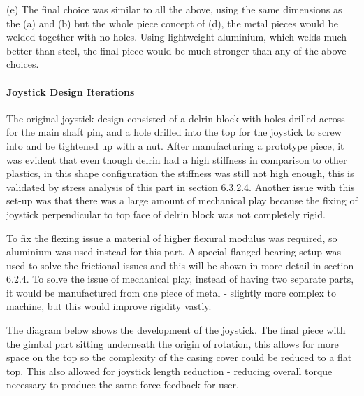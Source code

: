 (e) The final choice was similar to all the above, using the same dimensions as the (a) and (b) but the whole piece concept of (d), the metal pieces would be welded together with no holes. Using lightweight aluminium, which welds much better than steel, the final piece would be much stronger than any of the above choices.



\paragraph{Joystick Design Iterations} %
\label{par:joystick_design_iterations}

The original joystick design consisted of a delrin block with holes drilled across for the main shaft pin, and a hole drilled into the top for the joystick to screw into and be tightened up with a nut. After manufacturing a prototype piece, it was evident that even though delrin had a high stiffness in comparison to other plastics, in this shape configuration the stiffness was still not high enough, this is validated by stress analysis of this part in section 6.3.2.4. Another issue with this set-up was that there was a large amount of mechanical play because the fixing of joystick perpendicular to top face of delrin block was not completely rigid.

To fix the flexing issue a material of higher flexural modulus was required, so aluminium was used instead for this part. A special flanged bearing setup was used to solve the frictional issues and this will be shown in more detail in section 6.2.4. To solve the issue of mechanical play, instead of having two separate parts, it would be manufactured from one piece of metal - slightly more complex to machine, but this would improve rigidity vastly.

The diagram below shows the development of the joystick. The final piece with the gimbal part sitting underneath the origin of rotation, this allows for more space on the top so the complexity of the casing cover could be reduced to a flat top. This also allowed for joystick length reduction - reducing overall torque necessary to produce the same force feedback for user.


